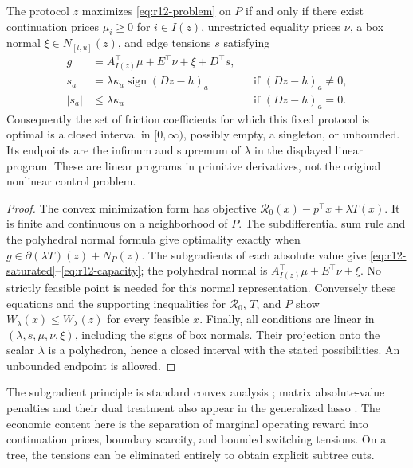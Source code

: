 \begin{theorem}\label{thm:r12-balance}
The protocol $z$ maximizes \eqref{eq:r12-problem} on $P$ if and only if there exist continuation prices $\mu_i\geq0$ for $i\in I(z)$, unrestricted equality prices $\nu$, a box normal $\xi\in N_{[l,u]}(z)$, and edge tensions $s$ satisfying
\begin{align}
 g&=A_{I(z)}^\top\mu+E^\top\nu+\xi+D^\top s,\label{eq:r12-balance}\\
 s_a&=\lambda\kappa_a\operatorname{sign}(Dz-h)_a
                  &&\text{if }(Dz-h)_a\ne0,\label{eq:r12-saturated}\\
 |s_a|&\leq\lambda\kappa_a
                  &&\text{if }(Dz-h)_a=0.\label{eq:r12-capacity}
\end{align}
Consequently the set of friction coefficients for which this fixed protocol is optimal is a closed interval in $[0,\infty)$, possibly empty, a singleton, or unbounded. Its endpoints are the infimum and supremum of $\lambda$ in the displayed linear program. These are linear programs in primitive derivatives, not the original nonlinear control problem.
\end{theorem}
\begin{proof}
The convex minimization form has objective $\mathcal R_0(x)-p^\top x+\lambda T(x)$. It is finite and continuous on a neighborhood of $P$. The subdifferential sum rule and the polyhedral normal formula give optimality exactly when
$g\in\partial(\lambda T)(z)+N_P(z)$.
The subgradients of each absolute value give \eqref{eq:r12-saturated}--\eqref{eq:r12-capacity}; the polyhedral normal is $A_{I(z)}^\top\mu+E^\top\nu+\xi$. No strictly feasible point is needed for this normal representation. Conversely these equations and the supporting inequalities for $\mathcal R_0$, $T$, and $P$ show $W_\lambda(x)\leq W_\lambda(z)$ for every feasible $x$. Finally, all conditions are linear in $(\lambda,s,\mu,\nu,\xi)$, including the signs of box normals. Their projection onto the scalar $\lambda$ is a polyhedron, hence a closed interval with the stated possibilities. An unbounded endpoint is allowed.
\end{proof}
The subgradient principle is standard convex analysis \citep{BoydVandenberghe2004}; matrix absolute-value penalties and their dual treatment also appear in the generalized lasso \citep{TibshiraniTaylor2011}. The economic content here is the separation of marginal operating reward into continuation prices, boundary scarcity, and bounded switching tensions. On a tree, the tensions can be eliminated entirely to obtain explicit subtree cuts.

